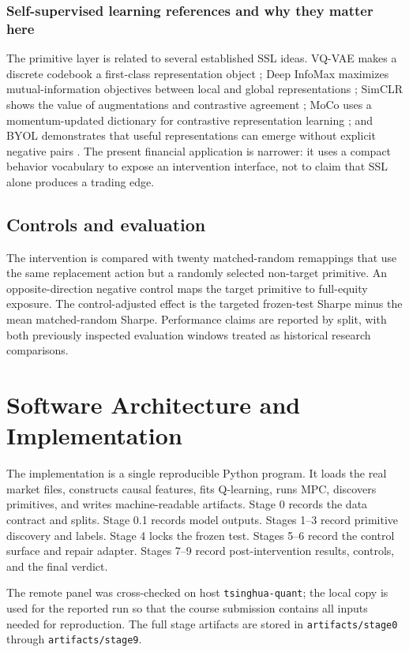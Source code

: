 \documentclass[11pt,a4paper]{article}
\begin{document}
\subsubsection{Self-supervised learning references and why they matter here}
The primitive layer is related to several established SSL ideas. VQ-VAE makes a discrete codebook a first-class representation object \cite{oord2017vqvae}; Deep InfoMax maximizes mutual-information objectives between local and global representations \cite{hjelm2019infomax}; SimCLR shows the value of augmentations and contrastive agreement \cite{chen2020simclr}; MoCo uses a momentum-updated dictionary for contrastive representation learning \cite{he2020moco}; and BYOL demonstrates that useful representations can emerge without explicit negative pairs \cite{grill2020byol}. The present financial application is narrower: it uses a compact behavior vocabulary to expose an intervention interface, not to claim that SSL alone produces a trading edge.

\subsection{Controls and evaluation}
The intervention is compared with twenty matched-random remappings that use the same replacement action but a randomly selected non-target primitive. An opposite-direction negative control maps the target primitive to full-equity exposure. The control-adjusted effect is the targeted frozen-test Sharpe minus the mean matched-random Sharpe. Performance claims are reported by split, with both previously inspected evaluation windows treated as historical research comparisons.



\section{Software Architecture and Implementation}
The implementation is a single reproducible Python program. It loads the real market files, constructs causal features, fits Q-learning, runs MPC, discovers primitives, and writes machine-readable artifacts. Stage 0 records the data contract and splits. Stage 0.1 records model outputs. Stages 1--3 record primitive discovery and labels. Stage 4 locks the frozen test. Stages 5--6 record the control surface and repair adapter. Stages 7--9 record post-intervention results, controls, and the final verdict.

The remote panel was cross-checked on host \texttt{tsinghua-quant}; the local copy is used for the reported run so that the course submission contains all inputs needed for reproduction. The full stage artifacts are stored in \texttt{artifacts/stage0} through \texttt{artifacts/stage9}.
\end{document}
